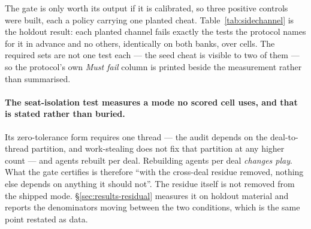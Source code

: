 The gate is only worth its output if it is calibrated, so three positive controls were built, each a
policy carrying one planted cheat. Table~\ref{tab:sidechannel} is the holdout result:
each planted channel fails exactly the tests the protocol
names for it in advance and no others, identically on both banks, over \vsevenSideCells{} cells.
The required sets are not one test each --- the seed cheat is visible to two of them --- so the
protocol's own \emph{Must fail} column is printed beside the measurement rather than summarised.

\begin{table}[t]\centering
\caption{The calibrated side-channel positive controls, on holdout material. \emph{Must fail} is the
set the protocol names for each planted channel in advance. A cheat failing a test outside its own
set, or missing one inside it, would mean the gate does not discriminate and no seat-isolation
statement in this report could be read as a measurement.}
\label{tab:sidechannel}

\end{table}

\paragraph{The seat-isolation test measures a mode no scored cell uses, and that is stated rather
than buried.} Its zero-tolerance form requires one thread --- the audit depends on the deal-to-thread
partition, and work-stealing does not fix that partition at any higher count --- and agents rebuilt
per deal. Rebuilding agents per deal \emph{changes play}. What the gate certifies is therefore ``with
the cross-deal residue removed, nothing else depends on anything it should not''. The residue itself
is not removed from the shipped mode. \S\ref{sec:results-residual} measures it on holdout material and
reports the denominators moving between the two conditions, which is the same point restated as
data.
